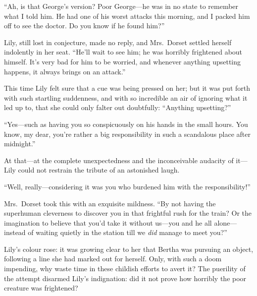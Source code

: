 \documentclass[12pt,a4paper]{book}
\begin{document}
``Ah, is that George's version? Poor George---he was in no state to
remember what I told him. He had one of his worst attacks this
morning, and I packed him off to see the doctor. Do you know if
he found him?''





Lily, still lost in conjecture, made no reply, and Mrs.\ Dorset
settled herself indolently in her seat. ``He'll wait to see him;
he was horribly frightened about himself. It's very bad for him
to be worried, and whenever anything upsetting happens, it always
brings on an attack.''





This time Lily felt sure that a cue was being pressed on her; but
it was put forth with such startling suddenness, and with so
incredible an air of ignoring what it led up to, that she could
only falter out doubtfully: ``Anything upsetting?''





``Yes---such as having you so conspicuously on his hands in the
small hours. You know, my dear, you're rather a big
responsibility in such a scandalous place after midnight.''





At that---at the complete unexpectedness and the inconceivable
audacity of it---Lily could not restrain the tribute of an
astonished laugh.





``Well, really---considering it was you who burdened him with the
responsibility!''





Mrs.\ Dorset took this with an exquisite mildness. ``By not having
the superhuman cleverness to discover you in that frightful rush
for the train? Or the imagination to believe that you'd take it
without us---you and he all alone---instead of waiting quietly in
the station till we \textit{did} manage to meet you?''





Lily's colour rose: it was growing clear to her that Bertha was
pursuing an object, following a line she had marked out for
herself. Only, with such a doom impending, why waste time in
these childish efforts to avert it? The puerility of the
attempt disarmed Lily's indignation: did it not prove how
horribly the poor creature was frightened?
\end{document}
